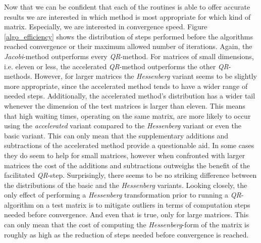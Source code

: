 \documentclass[12pt]{article}
\begin{document}
Now that we can be confident that each of the routines is able to offer accurate results we are interested in which method is most appropriate for which kind of matrix. Especially, we are interested in convergence speed. Figure \ref{algo_efficiency} shows the distribution of steps performed before the algorithms reached convergence or their maximum allowed number of iterations. Again, the \textit{Jacobi}-method outperforms every \textit{QR}-method. For matrices of small dimensions, i.e. eleven or less, the accelerated \textit{QR}-method outperforms the other \textit{QR}-methods. However, for larger matrices the \textit{Hessenberg} variant seems to be slightly more appropriate, since the accelerated method tends to have a wider range of needed steps. Additionally, the accelerated method's distribution has a wider tail whenever the dimension of the test matrices is larger than eleven. This means that high waiting times, operating on the same matrix, are more likely to occur using the \textit{accelerated} variant compared to the \textit{Hessenberg} variant or even the basic variant. This can only mean that the supplementary additions and subtractions of the accelerated method provide a questionable aid. In some cases they do seem to help for small matrices, however when confronted with larger matrices the cost of the additions and subtractions outweighs the benefit of the facilitated \textit{QR}-step. Surprisingly, there seems to be no striking difference between the distributions of the basic and the \textit{Hessenberg} variants. Looking closely, the only effect of performing a \textit{Hessenberg} transformation prior to running a \textit{QR}-algorithm on a test matrix is to mitigate outliers in terms of computation steps needed before convergence. And even that is true, only for large matrices. This can only mean that the cost of computing the \textit{Hessenberg}-form of the matrix is roughly as high as the reduction of steps needed before convergence is reached.

\end{document}

